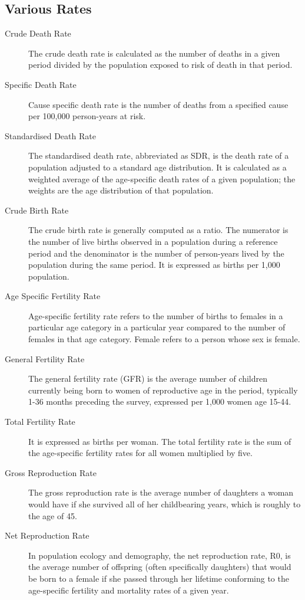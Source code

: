 \documentclass[
10pt, %
a4paper, %
]{report}
\begin{document}
\subsection*{Various Rates}
\begin{description}
\item[Crude Death Rate] The crude death rate is calculated as the number of deaths in a given period divided by the population exposed to risk of death in that period.
\item[Specific Death Rate] Cause specific death rate is the number of deaths from a specified cause per 100,000 person-years at risk.
\item[Standardised Death Rate] The standardised death rate, abbreviated as SDR, is the death rate of a population adjusted to a standard age distribution. It is calculated as a weighted average of the age-specific death rates of a given population; the weights are the age distribution of that population.
\item[Crude Birth Rate] The crude birth rate is generally computed as a ratio. The numerator is the number of  live births observed in a population during a reference period and the denominator is  the number of person-years lived by the population during the same period. It is expressed as births per 1,000 population.
\item[Age Specific Fertility Rate] Age-specific fertility rate refers to the number of births to females in a particular age category in a particular year compared to the number of females in that age category. Female refers to a person whose sex is female.
\item[General Fertility Rate] The general fertility rate (GFR) is the average number of children currently being born to women of reproductive age in the period, typically 1-36 months preceding the survey, expressed per 1,000 women age 15-44.
\item[Total Fertility Rate] It is expressed as births per woman. The total fertility rate is the sum of the age-specific fertility rates for all women multiplied by five.
\item[Gross Reproduction Rate] The gross reproduction rate is the average number of daughters a woman would have if she survived all of her childbearing years, which is roughly to the age of 45.
\item[Net Reproduction Rate]
In population ecology and demography, the net reproduction rate, R0, is the average number of offspring (often specifically daughters) that would be born to a female if she passed through her lifetime conforming to the age-specific fertility and mortality rates of a given year.
\end{description}
\end{document}
